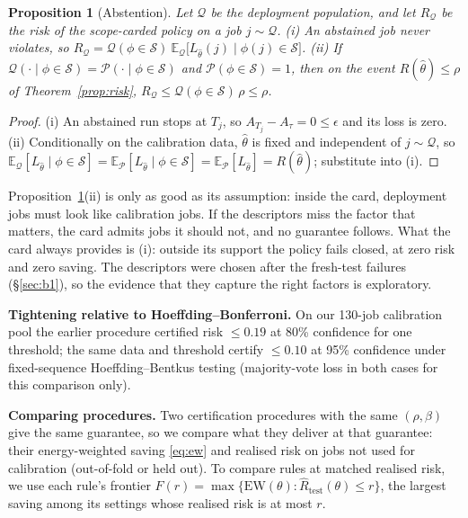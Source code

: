 \documentclass[3p,twocolumn,10pt]{elsarticle}
\newtheorem{proposition}{Proposition}
\theoremstyle{definition}
\begin{document}
\begin{proposition}[Abstention]
\label{prop:scope}
Let $\mathcal{Q}$ be the deployment population, and let $R_{\mathcal{Q}}$ be the risk of the scope-carded policy on a job $j\sim\mathcal{Q}$.
(i) An abstained job never violates, so $R_{\mathcal{Q}}=\mathcal{Q}(\phi\in\mathcal{S})\ \mathbb{E}_{\mathcal{Q}}\big[L_{\hat\theta}(j)\mid\phi(j)\in\mathcal{S}\big]$.
(ii) If $\mathcal{Q}(\cdot\mid\phi\in\mathcal{S})=\mathcal{P}(\cdot\mid\phi\in\mathcal{S})$ and $\mathcal{P}(\phi\in\mathcal{S})=1$, then on the event $R(\hat\theta)\le\rho$ of Theorem~\ref{prop:risk}, $R_{\mathcal{Q}}\le\mathcal{Q}(\phi\in\mathcal{S})\,\rho\le\rho$.
\end{proposition}
\begin{proof}
(i) An abstained run stops at $T_j$, so $A_{T_j}-A_{\tau}=0\le\epsilon$ and its loss is zero. (ii) Conditionally on the calibration data, $\hat\theta$ is fixed and independent of $j\sim\mathcal{Q}$, so $\mathbb{E}_{\mathcal{Q}}[L_{\hat\theta}\mid\phi\in\mathcal{S}]=\mathbb{E}_{\mathcal{P}}[L_{\hat\theta}\mid\phi\in\mathcal{S}]=\mathbb{E}_{\mathcal{P}}[L_{\hat\theta}]=R(\hat\theta)$; substitute into (i).
\end{proof}

\noindent Proposition~\ref{prop:scope}(ii) is only as good as its assumption: inside the card, deployment jobs must look like calibration jobs. If the descriptors miss the factor that matters, the card admits jobs it should not, and no guarantee follows. What the card always provides is (i): outside its support the policy fails closed, at zero risk and zero saving. The descriptors were chosen after the fresh-test failures (\S\ref{sec:b1}), so the evidence that they capture the right factors is exploratory.

\textbf{Tightening relative to Hoeffding--Bonferroni.} On our 130-job calibration pool the earlier procedure certified risk $\le0.19$ at 80\% confidence for one threshold; the same data and threshold certify $\le0.10$ at 95\% confidence under fixed-sequence Hoeffding--Bentkus testing (majority-vote loss in both cases for this comparison only).

\textbf{Comparing procedures.} Two certification procedures with the same $(\rho,\beta)$ give the same guarantee, so we compare what they deliver at that guarantee: their energy-weighted saving \eqref{eq:ew} and realised risk on jobs not used for calibration (out-of-fold or held out). To compare rules at matched realised risk, we use each rule's frontier $F(r)=\max\{\mathrm{EW}(\theta):\hat R_{\mathrm{test}}(\theta)\le r\}$, the largest saving among its settings whose realised risk is at most $r$.
\end{document}
